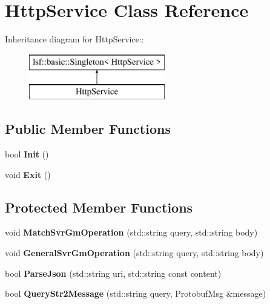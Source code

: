 \hypertarget{classHttpService}{
\section{HttpService Class Reference}
\label{classHttpService}
}
Inheritance diagram for HttpService::\begin{figure}[H]
\begin{center}
\leavevmode
\includegraphics[height=2cm]{classHttpService}
\end{center}
\end{figure}
\subsection*{Public Member Functions}
\begin{DoxyCompactItemize}
\item 
\hypertarget{classHttpService_a296e11a4bb783c4c3b76550b598f9344}{
bool {\bfseries Init} ()}
\label{classHttpService_a296e11a4bb783c4c3b76550b598f9344}

\item 
\hypertarget{classHttpService_a9fd7dbfe5ccade21bf3a0403ddf14d8a}{
void {\bfseries Exit} ()}
\label{classHttpService_a9fd7dbfe5ccade21bf3a0403ddf14d8a}

\end{DoxyCompactItemize}
\subsection*{Protected Member Functions}
\begin{DoxyCompactItemize}
\item 
\hypertarget{classHttpService_a145a834bce30b1a90c7d64dd0486142c}{
void {\bfseries MatchSvrGmOperation} (std::string query, std::string body)}
\label{classHttpService_a145a834bce30b1a90c7d64dd0486142c}

\item 
\hypertarget{classHttpService_a816ab28ee9302f74c8ee9ee1ed72d3c0}{
void {\bfseries GeneralSvrGmOperation} (std::string query, std::string body)}
\label{classHttpService_a816ab28ee9302f74c8ee9ee1ed72d3c0}

\item 
\hypertarget{classHttpService_a925991674186ae4dca2b788363d8bad6}{
bool {\bfseries ParseJson} (std::string uri, std::string const content)}
\label{classHttpService_a925991674186ae4dca2b788363d8bad6}

\item 
\hypertarget{classHttpService_a006e7756b3098fd7b3162058ad32e4d0}{
bool {\bfseries QueryStr2Message} (std::string query, ProtobufMsg \&message)}
\label{classHttpService_a006e7756b3098fd7b3162058ad32e4d0}

\end{DoxyCompactItemize}
